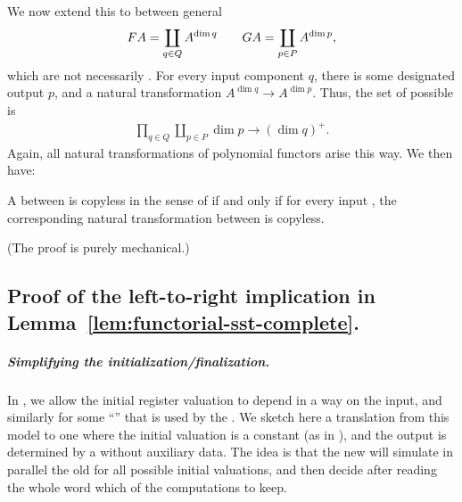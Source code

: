 We now extend this  to  between general 
\begin{align*}
\functor A = \coprod_{q \in Q} A^{\dim q} \qquad 
\functorg A = \coprod_{p \in P} A^{\dim p},
\end{align*}
which are not necessarily . For every input component $q$, there is some designated output  $p$, and a natural transformation $A^{\dim q} \to A^{\dim p}$. Thus, the set of possible  is
\begin{align*}
\prod_{q \in Q} \coprod_{p \in P} \dim p \to (\dim q)^+.
\end{align*}
Again, all natural transformations of polynomial functors arise this way.
We then have:
\begin{claim}
  A  between  is copyless in the sense of  if and only if for every input , the corresponding natural transformation between  is copyless.
\end{claim}

(The proof is purely mechanical.)

\subsection{Proof of the left-to-right implication in Lemma~\ref{lem:functorial-sst-complete}.}

\subparagraph{Simplifying the initialization/finalization.}

In , we allow the initial register valuation to depend in a  way on the input, and similarly for some \enquote{} that is used by the . We sketch here a translation from this model to one where the initial valuation is a constant (as in ), and the output is determined by a  without auxiliary data. The idea is that the new \functorialsst will simulate in parallel the old \functorialsst for all possible initial valuations, and then decide after reading the whole word which of the computations to keep.

